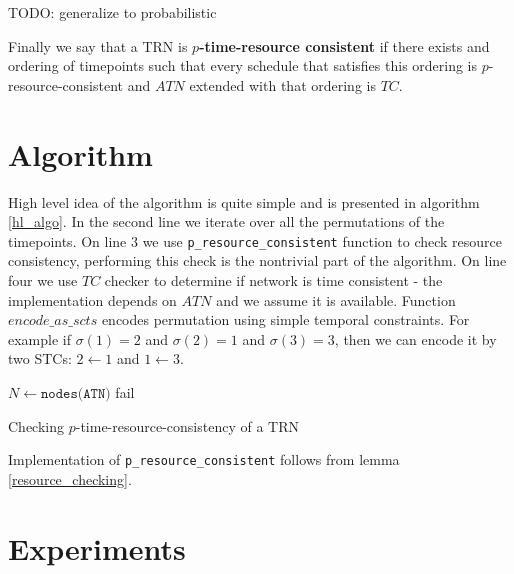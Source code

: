 \documentclass{article}
\begin{document}
\begin{multicols}{2}
TODO: generalize to probabilistic

Finally we say that a TRN is \textbf{$p$-time-resource consistent} if there exists and ordering of timepoints such that every schedule that satisfies this ordering is $p$-resource-consistent and $ATN$ extended with that ordering is $TC$.

\section{Algorithm}
High level idea of the algorithm is quite simple and is presented in algorithm \ref{hl_algo}. In the second line we iterate over all the permutations of the timepoints. On line 3 we use \texttt{p\_resource\_consistent} function to check resource consistency, performing this check is the nontrivial part of the algorithm. On line four we use $TC$ checker to determine if network is time consistent - the implementation depends on $ATN$ and we assume it is available. Function $encode\_as\_scts$ encodes permutation using simple temporal constraints. For example if $\sigma(1) = 2$ and $\sigma(2) = 1$ and $\sigma(3) = 3$, then we can encode it by two STCs: $ 2 \leftarrow 1 $ and $1 \leftarrow 3$.

\begin{algorithm}[H]
    \label{hl_algo}
    $N \leftarrow \texttt{nodes(ATN)}$\;
    fail\;
    \caption{Checking $p$-time-resource-consistency of a TRN }
\end{algorithm}
Implementation of \texttt{p\_resource\_consistent} follows from lemma \ref{resource_checking}.






\section{Experiments}

\end{multicols}
\end{document}
